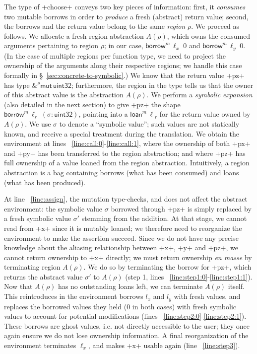 \documentclass[acmsmall,screen]{acmart}
\newcommand\kw[1]{\ensuremath{\mathsf{#1}}}
\newcommand\tmbrw[2]{\ensuremath{\mathsf{\&}^#1\mathsf{mut}\,#2}}
\newcommand\emborrow[2]{\ensuremath{\mathsf{borrow}^m\,#1\;#2}}
\newcommand\emloan[1]{\ensuremath{\mathsf{loan}^m\,#1}}
\begin{document}
The type of \li+choose+ conveys two key pieces of information: first, it
\emph{consumes} two mutable borrows in order to \emph{produce} a fresh (abstract)
return value; second, the borrows and the return value belong to the same %
\emph{region} $\rho$.
We proceed
as follows. We allocate a fresh region abstraction $A(\rho)$, which owns the consumed
arguments pertaining to region $\rho$; in our case, $\emborrow{\ell_x}0$ and
$\emborrow{\ell_y}0$.
 (In the case of
multiple regions per function type, we need to project the ownership of the
arguments along their respective regions; we handle this case formally in
§~\ref{sec:concrete-to-symbolic}.)
We know that the return value \li+pz+ has type $\tmbrw\rho{\kw{uint32}}$;
furthermore, the region in
the type tells us that the owner of this abstract value is the abstraction
$A(\rho)$. We perform a \emph{symbolic expansion} (also detailed in the next
section) to give \li+pz+ the shape
$\emborrow{\ell_r}{(\sigma: \kw{uint32})}$, pointing into a $\emloan\ell_r$ for
the return value owned by $A(\rho)$. We use $\sigma$ to denote a ``symbolic value''; such values
are not statically known, and receive a special treatment during the
translation.
We obtain the environment at lines ~\ref{line:call:0}-\ref{line:call:1}, where
the ownership of both \li+px+ and \li+py+ has been transferred to the
region abstraction; and where \li+pz+ has full ownership of a value loaned from the
region abstraction. Intuitively, a region abstraction is a bag containing borrows (what has
been consumed) and loans (what has been produced).

At line ~\ref{line:assign}, the mutation type-checks, and does not affect the abstract
environment: the symbolic value $\sigma$ borrowed through \li+pz+ is simply replaced
by a fresh symbolic value $\sigma'$ stemming from the addition.
At that stage, we cannot read from \li+x+ since it is mutably loaned; we
therefore need to reorganize the environment to make the assertion succeed.
Since we
do not have any precise knowledge about the aliasing relationship between
\li+x+, \li+y+ and \li+pz+, we cannot return ownership to \li+x+ directly; we
must return ownership \emph{en masse} by terminating region $A(\rho)$. We do so
by terminating the borrow for \li+pz+, which returns the abstract value
$\sigma'$ to
$A(\rho)$ (step 1, lines ~\ref{line:step1:0}-\ref{line:step1:1}).
Now that $A(\rho)$ has no outstanding loans left, we can terminate
$A(\rho)$ itself. This reintroduces in the environment borrows $l_x$ and $l_y$ with fresh
  values, and replaces the borrowed values they held ($0$ in both
  cases) with fresh
  symbolic values to account for potential modifications (lines ~\ref{line:step2:0}-\ref{line:step2:1}).
These borrows are ghost values, i.e. not
directly accessible to the user; they once again ensure we do not lose ownership
information.
A final reorganization of the environment
terminates $\ell_x$,
and makes \li+x+ usable again (line ~\ref{line:step3}).
\end{document}
